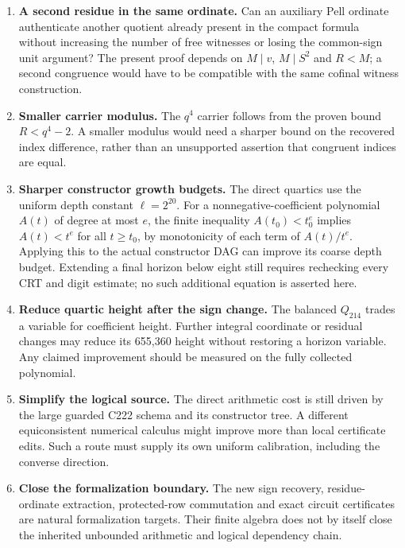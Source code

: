 \documentclass[11pt]{article}
\begin{document}
\begin{enumerate}[leftmargin=*]
\item \textbf{A second residue in the same ordinate.}
Can an auxiliary Pell ordinate authenticate another quotient already
present in the compact formula without increasing the number of free
witnesses or losing the common-sign unit argument? The present proof
depends on $M\mid v$, $M\mid S^2$ and $R<M$; a second congruence would
have to be compatible with the same cofinal witness construction.

\item \textbf{Smaller carrier modulus.}
The $q^4$ carrier follows from the proven bound $R<q^4-2$.
A smaller modulus would need a sharper bound on the recovered
index difference, rather than an unsupported assertion that congruent
indices are equal.

\item \textbf{Sharper constructor growth budgets.}
The direct quartics use the uniform depth constant $\ell=2^{20}$.
For a nonnegative-coefficient polynomial $A(t)$ of degree at most $e$,
the finite inequality $A(t_0)<t_0^e$ implies
$A(t)<t^e$ for all $t\ge t_0$, by monotonicity of each term of
$A(t)/t^e$. Applying this to the actual constructor DAG can improve
its coarse depth budget. Extending a final horizon below eight
still requires rechecking every CRT and digit estimate; no such
additional equation is asserted here.

\item \textbf{Reduce quartic height after the sign change.}
The balanced $Q_{214}$ trades a variable for coefficient height.
Further integral coordinate or residual changes may reduce its
655,360 height without restoring a horizon variable. Any claimed
improvement should be measured on the fully collected polynomial.

\item \textbf{Simplify the logical source.}
The direct arithmetic cost is still driven by the large guarded C222
schema and its constructor tree. A different equiconsistent numerical
calculus might improve more than local certificate edits. Such a route
must supply its own uniform calibration, including the converse direction.

\item \textbf{Close the formalization boundary.}
The new sign recovery, residue-ordinate extraction, protected-row
commutation and exact circuit certificates are natural formalization
targets. Their finite algebra does not by itself close the inherited
unbounded arithmetic and logical dependency chain.
\end{enumerate}
\end{document}
